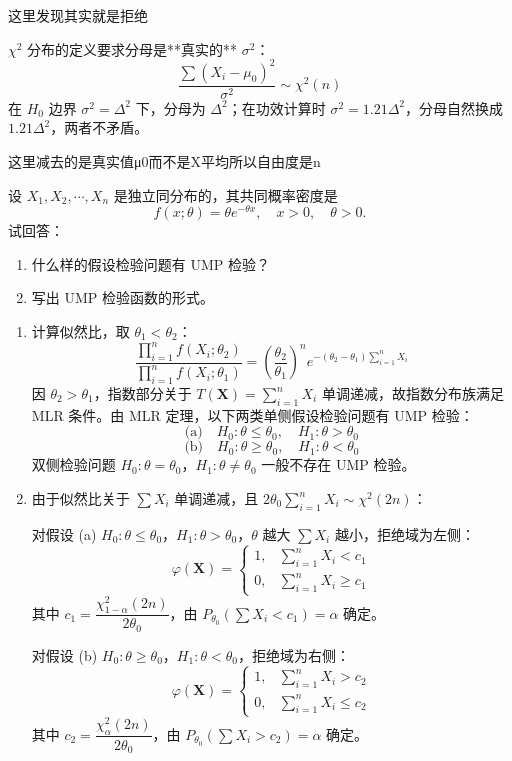 \begin{dxtips}
    这里发现其实就是拒绝
\end{dxtips}
\begin{note}
$\chi^2$ 分布的定义要求分母是**真实的** $\sigma^2$：
$$\frac{\sum(X_i-\mu_0)^2}{\sigma^2} \sim \chi^2(n)$$
在 $H_0$ 边界 $\sigma^2=\Delta^2$ 下，分母为 $\Delta^2$；在功效计算时 $\sigma^2=1.21\Delta^2$，分母自然换成 $1.21\Delta^2$，两者不矛盾。
\end{note}
\begin{dxtips}
    这里减去的是真实值μ0而不是X平均所以自由度是n
\end{dxtips}
\begin{homework}[5]
设 $X_1,X_2,\cdots,X_n$ 是独立同分布的，其共同概率密度是
\[
    f(x;\theta)=\theta e^{-\theta x},\quad x>0,\quad \theta>0.
\]
试回答：
\begin{enumerate}
    \item 什么样的假设检验问题有 UMP 检验？
    \item 写出 UMP 检验函数的形式。
\end{enumerate}
\end{homework}
\begin{solution}
\begin{enumerate}
    \item[(1)] 计算似然比，取 $\theta_1 < \theta_2$：
    \[
    \frac{\prod_{i=1}^n f(X_i;\theta_2)}{\prod_{i=1}^n f(X_i;\theta_1)} = \left(\frac{\theta_2}{\theta_1}\right)^n e^{-(\theta_2-\theta_1)\sum_{i=1}^n X_i}
    \]
    因 $\theta_2 > \theta_1$，指数部分关于 $T(\boldsymbol{X}) = \sum_{i=1}^n X_i$ 单调递减，故指数分布族满足 MLR 条件。由 MLR 定理，以下两类单侧假设检验问题有 UMP 检验：
    \[
    \text{(a)}\quad H_0: \theta \leqslant \theta_0, \quad H_1: \theta > \theta_0
    \]
    \[
    \text{(b)}\quad H_0: \theta \geqslant \theta_0, \quad H_1: \theta < \theta_0
    \]
    双侧检验问题 $H_0: \theta = \theta_0$，$H_1: \theta \neq \theta_0$ 一般不存在 UMP 检验。
    \item[(2)] 由于似然比关于 $\sum X_i$ 单调递减，且 $2\theta_0\sum_{i=1}^n X_i \sim \chi^2(2n)$：

    对假设 (a) $H_0: \theta \leqslant \theta_0$，$H_1: \theta > \theta_0$，$\theta$ 越大 $\sum X_i$ 越小，拒绝域为左侧：
    \[
    \varphi(\boldsymbol{X}) = \begin{cases} 1, & \sum_{i=1}^n X_i < c_1 \\ 0, & \sum_{i=1}^n X_i \geqslant c_1 \end{cases}
    \]
    其中 $c_1 = \dfrac{\chi^2_{1-\alpha}(2n)}{2\theta_0}$，由 $P_{\theta_0}\!\left(\sum X_i < c_1\right) = \alpha$ 确定。

    对假设 (b) $H_0: \theta \geqslant \theta_0$，$H_1: \theta < \theta_0$，拒绝域为右侧：
    \[
    \varphi(\boldsymbol{X}) = \begin{cases} 1, & \sum_{i=1}^n X_i > c_2 \\ 0, & \sum_{i=1}^n X_i \leqslant c_2 \end{cases}
    \]
    其中 $c_2 = \dfrac{\chi^2_{\alpha}(2n)}{2\theta_0}$，由 $P_{\theta_0}\!\left(\sum X_i > c_2\right) = \alpha$ 确定。
\end{enumerate}
\end{solution}
